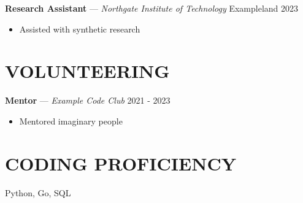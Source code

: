 \documentclass[11pt]{article}
\newcommand{\workentry}[4]{%
  \noindent\textbf{#1} --- \textit{#2} \hfill #3\par
  #4
}
\newcommand{\cventry}[5]{%
  \noindent\textbf{#1} --- \textit{#2} \hfill #3 \hfill #4\par
  #5
}
\newenvironment{highlights}{\begin{itemize}}{\end{itemize}}
\begin{document}
\cventry{Research Assistant}{Northgate Institute of Technology}{Exampleland}{2023}{%
\begin{highlights}
  \item Assisted with synthetic research
\end{highlights}}

\section*{VOLUNTEERING}

\workentry{Mentor}{Example Code Club}{2021 - 2023}{%
\begin{highlights}
  \item Mentored imaginary people
\end{highlights}}

\section*{CODING PROFICIENCY}

Python, Go, SQL
\end{document}
